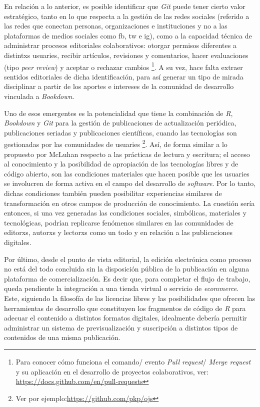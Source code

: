 \documentclass[
]{krantz}
\begin{document}
En relación a lo anterior, es posible identificar que \emph{Git} puede tener cierto valor estratégico, tanto en lo que respecta a la gestión de las redes sociales (referido a las redes que conectan personas, organizaciones e instituciones y no a las plataformas de medios sociales como fb, tw e ig), como a la capacidad técnica de administrar procesos editoriales colaborativos: otorgar permisos diferentes a distintxs usuaries, recibir artículos, revisiones y comentarios, hacer evaluaciones (tipo \emph{peer review}) y aceptar o rechazar cambios \footnote{Para conocer cómo funciona el comando/ evento \emph{Pull request}/ \emph{Merge request} y su aplicación en el desarrollo de proyectos colaborativos, ver: \url{https://docs.github.com/en/pull-requests}}. A su vez, hace falta extraer sentidos editoriales de dicha identificación, para así generar un tipo de mirada disciplinar a partir de los aportes e intereses de la comunidad de desarrollo vinculada a \emph{Bookdown}.

Uno de esos emergentes es la potencialidad que tiene la combinación de \emph{R}, \emph{Bookdown} y \emph{Git} para la gestión de publicaciones de actualización periódica, publicaciones seriadas \citep{seminariopublicacionesdigitalesUnidadParte2021a} y publicaciones científicas, cuando las tecnologías son gestionadas por las comunidades de usuaries \footnote{Ver por ejemplo:\url{https://github.com/pkp/ojs}}. Así, de forma similar a lo propuesto por McLuhan \citep{marshallmcluhanComprenderMediosComunicacion1994} respecto a las prácticas de lectura y escritura; el acceso al conocimiento y la posibilidad de apropiación de las tecnologías libres y de código abierto, son las condiciones materiales que hacen posible que les usuaries se involucren de forma activa en el campo del desarrollo de \emph{software}. Por lo tanto, dichas condiciones también pueden posibilitar experiencias similares de transformación en otros campos de producción de conocimiento. La cuestión sería entonces, si una vez generadas las condiciones sociales, simbólicas, materiales y tecnológicas, podrían replicarse fenómenos similares en las comunidades de editorxs, autorxs y lectorxs como un todo y en relación a las publicaciones digitales.

Por último, desde el punto de vista editorial, la edición electrónica como proceso no está del todo concluida sin la disposición pública de la publicación en alguna plataforma de comercialización. Es decir que, para completar el flujo de trabajo, queda pendiente la integración a una tienda virtual o servicio de \emph{ecommerce}. Este, siguiendo la filosofía de las licencias libres y las posibilidades que ofrecen las herramientas de desarrollo que constituyen los fragmentos de código de \emph{R} para adecuar el contenido a distintos formatos digitales, idealmente debería permitir administrar un sistema de previsualización y suscripción a distintos tipos de contenidos de una misma publicación.
\end{document}
